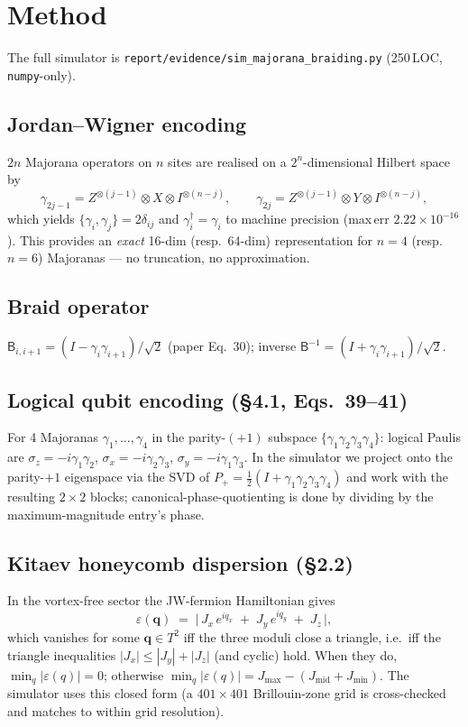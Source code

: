 \documentclass[11pt]{article}
\newcommand{\gam}{\gamma}
\newcommand{\B}{\mathsf{B}}
\begin{document}
\section{Method}\label{sec:method}

The full simulator is \texttt{report/evidence/sim\_majorana\_braiding.py} (250\,LOC, \texttt{numpy}-only).

\subsection{Jordan--Wigner encoding}
$2n$ Majorana operators on $n$ sites are realised on a $2^n$-dimensional Hilbert space by
\[
\gam_{2j-1} = Z^{\otimes(j-1)}\otimes X\otimes I^{\otimes(n-j)},\qquad
\gam_{2j}   = Z^{\otimes(j-1)}\otimes Y\otimes I^{\otimes(n-j)},
\]
which yields $\{\gam_i,\gam_j\}=2\delta_{ij}$ and $\gam_i^\dagger=\gam_i$ to machine precision (max\,err $2.22\times 10^{-16}$). This provides an \emph{exact} 16-dim (resp.~64-dim) representation for $n=4$ (resp.~$n=6$) Majoranas --- no truncation, no approximation.

\subsection{Braid operator}
$\B_{i,i+1} = (I - \gam_i\gam_{i+1})/\sqrt{2}$ (paper Eq.~30); inverse $\B^{-1} = (I + \gam_i\gam_{i+1})/\sqrt{2}$.

\subsection{Logical qubit encoding (\S4.1, Eqs.~39--41)}
For 4 Majoranas $\gam_1,\ldots,\gam_4$ in the parity-$(+1)$ subspace
$\{\gam_1\gam_2\gam_3\gam_4\}$: logical Paulis are $\sigma_z=-i\gam_1\gam_2$, $\sigma_x=-i\gam_2\gam_3$, $\sigma_y=-i\gam_1\gam_3$. In the simulator we project onto the parity-$+1$ eigenspace via the SVD of $P_+=\tfrac12(I+\gam_1\gam_2\gam_3\gam_4)$ and work with the resulting $2\times 2$ blocks; canonical-phase-quotienting is done by dividing by the maximum-magnitude entry's phase.

\subsection{Kitaev honeycomb dispersion (\S2.2)}
In the vortex-free sector the JW-fermion Hamiltonian gives
\[
\varepsilon(\mathbf q) \;=\; \bigl|\,J_x\,e^{i q_x} \;+\; J_y\,e^{i q_y} \;+\; J_z\,\bigr|,
\]
which vanishes for some $\mathbf q\in T^2$ iff the three moduli close a triangle, i.e.~iff the triangle inequalities $|J_x|\le|J_y|+|J_z|$ (and cyclic) hold. When they do, $\min_q|\varepsilon(q)|=0$; otherwise $\min_q|\varepsilon(q)| = J_\text{max} - (J_\text{mid}+J_\text{min})$. The simulator uses this closed form (a $401\times 401$ Brillouin-zone grid is cross-checked and matches to within grid resolution).
\end{document}
